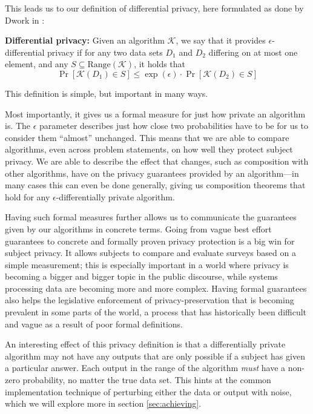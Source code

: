 \documentclass[12pt]{article}
\newcommand{\fancy}{\mathcal}
\begin{document}
This leads us to our definition of differential privacy, here formulated as done by Dwork in \cite{dwork2006_diffpriv}:

\begin{mdframed}
    \textbf{Differential privacy:} Given an algorithm $\fancy{K}$, we say that it provides $\epsilon$-differential privacy if for any two data sets $D_1$ and $D_2$ differing on at most one element, and any $S \subseteq \text{Range}(\fancy{K})$, it holds that
    \begin{equation}\label{eq:diffpriv}
        \Pr[\fancy{K}(D_1) \in S] \leq \exp(\epsilon) \cdot \Pr[\fancy{K}(D_2) \in S]
    \end{equation}
\end{mdframed}

This definition is simple, but important in many ways.

Most importantly, it gives us a formal measure for just how private an algorithm is. The $\epsilon$ parameter describes just how close two probabilities have to be for us to consider them ``almost'' unchanged. This means that we are able to compare algorithms, even across problem statements, on how well they protect subject privacy. We are able to describe the effect that changes, such as composition with other algorithms, have on the privacy guarantees provided by an algorithm---in many cases this can even be done generally, giving us composition theorems that hold for any $\epsilon$-differentially private algorithm.

Having such formal measures further allows us to communicate the guarantees given by our algorithms in concrete terms. Going from vague best effort guarantees to concrete and formally proven privacy protection is a big win for subject privacy. It allows subjects to compare and evaluate surveys based on a simple measurement; this is especially important in a world where privacy is becoming a bigger and bigger topic in the public discourse, while systems processing data are becoming more and more complex. Having formal guarantees also helps the legislative enforcement of privacy-preservation that is becoming prevalent in some parts of the world, a process that has historically been difficult and vague as a result of poor formal definitions. \bigskip

An interesting effect of this privacy definition is that a differentially private algorithm may not have any outputs that are only possible if a subject has given a particular answer. Each output in the range of the algorithm \emph{must} have a non-zero probability, no matter the true data set. This hints at the common implementation technique of perturbing either the data or output with noise, which we will explore more in section \ref{sec:achieving}.
\end{document}
